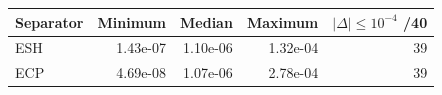 \begin{tabular}{lrrrr}
\toprule
Separator & Minimum & Median & Maximum & $|\Delta|\le10^{-4}$ /40 \\
\midrule
ESH & 1.43e-07 & 1.10e-06 & 1.32e-04 & 39 \\
ECP & 4.69e-08 & 1.07e-06 & 2.78e-04 & 39 \\
\bottomrule
\end{tabular}

